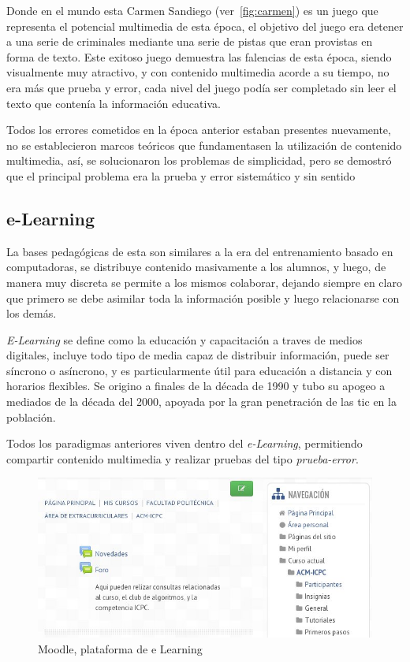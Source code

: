 Donde en el mundo esta Carmen Sandiego (ver~\ref{fig:carmen}) es un juego que
representa el potencial multimedia de esta época, el objetivo del juego era
detener a una serie de criminales mediante una serie de pistas que eran
provistas en forma de texto\cite{charsky:2010}. Este exitoso juego demuestra las
falencias de esta época, siendo visualmente muy atractivo, y con contenido
multimedia acorde a su tiempo, no era más que prueba y error, cada nivel del
juego podía ser completado sin leer el texto que contenía la información
educativa.

Todos los errores cometidos en la época anterior estaban presentes nuevamente,
no se establecieron marcos teóricos que fundamentasen la utilización de
contenido multimedia, así, se solucionaron los problemas de simplicidad, pero se
demostró que el principal problema era la prueba y error sistemático y sin
sentido\cite{egenfeldt2007third} 

\subsection{e-Learning}

La bases pedagógicas de esta son similares a la era del entrenamiento basado en
computadoras, se distribuye contenido masivamente a los alumnos, y luego, de
manera muy discreta se permite a los mismos colaborar, dejando siempre en claro
que primero se debe asimilar toda la información posible y luego relacionarse
con los demás\cite{leinonen:ict}.

\emph{E-Learning} se define como la educación y capacitación a traves de medios
digitales, incluye todo tipo de media capaz de distribuir información, puede ser
síncrono o asíncrono, y es particularmente útil para educación a distancia y con
horarios flexibles. Se origino a finales de la década de 1990 y tubo su apogeo a
mediados de la década del 2000, apoyada por la gran penetración de las \Gls{tic}
en la población\cite{punie:ict}.

Todos los paradigmas anteriores viven dentro del \emph{e-Learning}, permitiendo
compartir contenido multimedia y realizar pruebas del tipo \emph{prueba-error}. 

\begin{figure}[h] \centering \includegraphics[scale=0.5]{tics/moodle.jpg}
	\caption{Moodle, plataforma de e Learning} \label{fig:moodle}
\end{figure}

